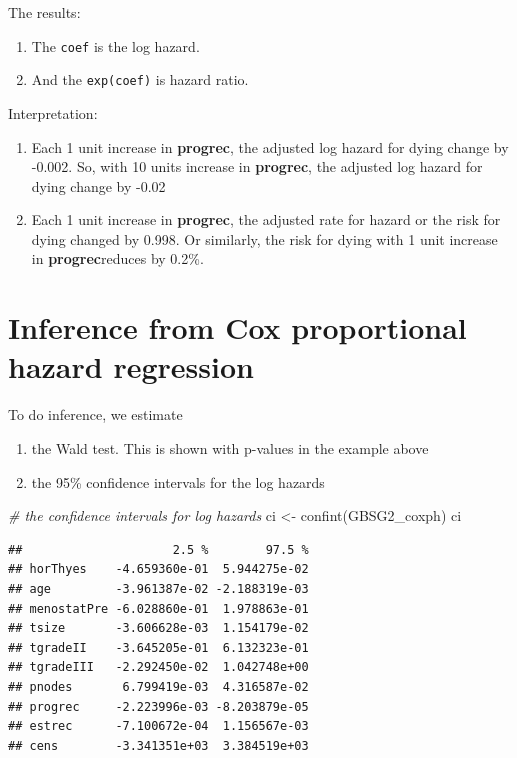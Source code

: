 \documentclass[
]{book}
\makeatletter
\newenvironment{Shaded}{\begin{snugshade}}{\end{snugshade}}
\newcommand{\CommentTok}[1]{\textcolor[rgb]{0.37,0.37,0.37}{\textit{#1}}}
\newcommand{\FunctionTok}[1]{\textcolor[rgb]{0,0,0}{#1}}
\newcommand{\NormalTok}[1]{#1}
\newcommand{\OtherTok}[1]{\textcolor[rgb]{0.37,0.37,0.37}{#1}}
\providecommand{\tightlist}{%
  \setlength{\itemsep}{0pt}\setlength{\parskip}{0pt}}
\newenvironment{kframe}{%
\medskip{}
\setlength{\fboxsep}{.8em}
 \def\at@end@of@kframe{}%
 \ifinner\ifhmode%
  \def\at@end@of@kframe{\end{minipage}}%
  \begin{minipage}{\columnwidth}%
 \fi\fi%
 \def\FrameCommand##1{\hskip\@totalleftmargin \hskip-\fboxsep
 \colorbox{shadecolor}{##1}\hskip-\fboxsep
     \hskip-\linewidth \hskip-\@totalleftmargin \hskip\columnwidth}%
 \MakeFramed {\advance\hsize-\width
   \@totalleftmargin\z@ \linewidth\hsize
   \@setminipage}}%
 {\par\unskip\endMakeFramed%
 \at@end@of@kframe}
\renewenvironment{Shaded}{\begin{kframe}}{\end{kframe}}
\makeatother
\begin{document}
The results:

\begin{enumerate}
\def\labelenumi{\arabic{enumi}.}
\tightlist
\item
  The \texttt{coef} is the log hazard.
\item
  And the \texttt{exp(coef)} is hazard ratio.
\end{enumerate}

Interpretation:

\begin{enumerate}
\def\labelenumi{\arabic{enumi}.}
\tightlist
\item
  Each 1 unit increase in \textbf{progrec}, the adjusted log hazard for dying change by -0.002. So, with 10 units increase in \textbf{progrec}, the adjusted log hazard for dying change by -0.02
\item
  Each 1 unit increase in \textbf{progrec}, the adjusted rate for hazard or the risk for dying changed by 0.998. Or similarly, the risk for dying with 1 unit increase in \textbf{progrec}reduces by 0.2\%.
\end{enumerate}

\hypertarget{inference-from-cox-proportional-hazard-regression}{%
\section{Inference from Cox proportional hazard regression}\label{inference-from-cox-proportional-hazard-regression}}

To do inference, we estimate

\begin{enumerate}
\def\labelenumi{\arabic{enumi}.}
\tightlist
\item
  the Wald test. This is shown with p-values in the example above
\item
  the 95\% confidence intervals for the log hazards
\end{enumerate}

\begin{Shaded}
\begin{Highlighting}[]
\CommentTok{\# the confidence intervals for log hazards}
\NormalTok{ci }\OtherTok{\textless{}{-}} \FunctionTok{confint}\NormalTok{(GBSG2\_coxph)}
\NormalTok{ci}
\end{Highlighting}
\end{Shaded}

\begin{verbatim}
##                     2.5 %        97.5 %
## horThyes    -4.659360e-01  5.944275e-02
## age         -3.961387e-02 -2.188319e-03
## menostatPre -6.028860e-01  1.978863e-01
## tsize       -3.606628e-03  1.154179e-02
## tgradeII    -3.645205e-01  6.132323e-01
## tgradeIII   -2.292450e-02  1.042748e+00
## pnodes       6.799419e-03  4.316587e-02
## progrec     -2.223996e-03 -8.203879e-05
## estrec      -7.100672e-04  1.156567e-03
## cens        -3.341351e+03  3.384519e+03
\end{verbatim}
\end{document}
